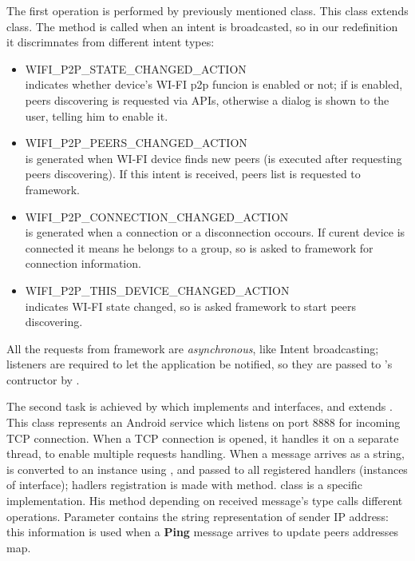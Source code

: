 	The first operation is performed by previously mentioned  class. This class extends  class. The method  is called when an intent is broadcasted, so in our redefinition it discrimnates from different intent types:
	\begin{itemize}
		\item WIFI\_P2P\_STATE\_CHANGED\_ACTION \hfill \\
		indicates whether device's WI-FI p2p funcion is enabled or not; if is enabled, peers discovering is requested via \direct APIs, otherwise a dialog is shown to the user, telling him to enable it.
		\item WIFI\_P2P\_PEERS\_CHANGED\_ACTION \hfill \\
		is generated when WI-FI device finds new peers (is executed after requesting peers discovering). If this intent is received, peers list is requested to \direct framework.
		\item WIFI\_P2P\_CONNECTION\_CHANGED\_ACTION \hfill \\
		is generated when a connection or a disconnection occours. If curent device is connected it means he belongs to a \direct group, so is asked to \direct framework for connection information.
		\item WIFI\_P2P\_THIS\_DEVICE\_CHANGED\_ACTION \hfill \\
		indicates WI-FI state changed, so is asked \direct framework to start peers discovering.		
	\end{itemize}

All the requests from \direct framework are \textit{asynchronous}, like Intent broadcasting; listeners are required to let the application be notified, so they are passed to 's contructor by .
	
	The second task is achieved by  which implements  and  interfaces, and extends . This class represents an Android service which listens on port 8888 for incoming TCP connection. When a TCP connection is opened, it handles it on a separate thread, to enable multiple requests handling. When a message arrives as a string, is converted to an  instance using , and passed to all registered handlers (instances of  interface); hadlers registration is made with  method.
	 class is a specific  implementation. His method  depending on received message's type calls different  operations. Parameter  contains the string representation of sender IP address: this information is used when a \textbf{Ping} message arrives to update peers addresses map.
	\\
